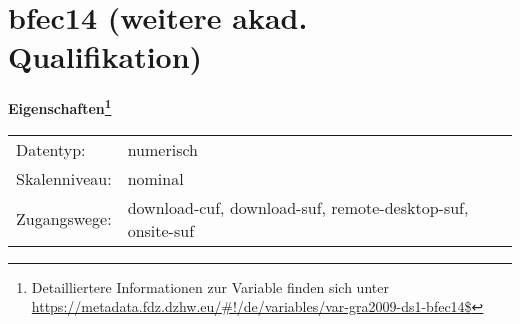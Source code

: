 
    \setcounter{footnote}{0}

    \vspace*{-1.8cm}
	\section{bfec14 (weitere akad. Qualifikation)}
	\label{section:bfec14}



    \vspace*{0.5cm}
    \noindent\textbf{Eigenschaften\footnote{Detailliertere Informationen zur Variable finden sich unter
		\url{https://metadata.fdz.dzhw.eu/\#!/de/variables/var-gra2009-ds1-bfec14$}}}\\
	\begin{tabularx}{\hsize}{@{}lX}
	Datentyp: & numerisch \\
	Skalenniveau: & nominal \\
	Zugangswege: &
	  download-cuf, 
	  download-suf, 
	  remote-desktop-suf, 
	  onsite-suf
 \\
    \end{tabularx}



